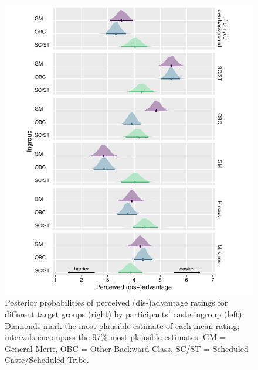 \documentclass[12pt, a4paper]{article}
\begin{document}
\begin{figure}
\centering
\includegraphics[scale=1]{../figures/figure-7}
\caption{
Posterior probabilities of perceived (dis-)advantage ratings for different target groups (right) by participants' caste ingroup (left). Diamonds mark the most plausible estimate of each mean rating; intervals encompass the 97\% most plausible estimates. GM = General Merit, OBC = Other Backward Class, SC/ST = Scheduled Caste/Scheduled Tribe.
}
\label{fig:ch5-s4-1}
\end{figure}
\end{document}
